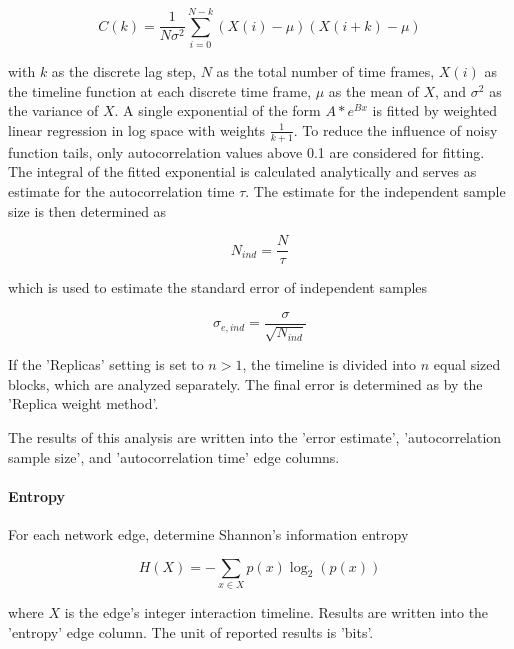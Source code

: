 \begin{equation}
  \label{eq:autocorrelation}
     C(k) = \frac{1}{N\sigma^2} \sum_{i=0}^{N-k} (X(i) - \mu) (X(i+k) - \mu)
\end{equation}

with $k$ as the discrete lag step, $N$ as the total number of time frames, $X(i)$ as the timeline function at each discrete time frame, $\mu$ as the mean of $X$, and $\sigma^2$ as the variance of $X$. A single exponential of the form $A * e^{Bx}$ is fitted by weighted linear regression in log space with weights $\frac{1}{k+1}$. To reduce the influence of noisy function tails, only autocorrelation values above 0.1 are considered for fitting. The integral of the fitted exponential is calculated analytically and serves as estimate for the autocorrelation time $\tau$. The estimate for the independent sample size is then determined as

\begin{equation}
  \label{eq:independent_sample_size}
  N_{ind} = \frac{N}{\tau}
\end{equation}

which is used to estimate the standard error of independent samples

\begin{equation}
  \label{eq:standard_error_independent}
  \sigma_{e,ind} = \frac{\sigma}{\sqrt{N_{ind}}}
\end{equation}

If the 'Replicas' setting is set to $n > 1$, the timeline is divided into $n$ equal sized blocks, which are analyzed separately. The final error is determined as by the 'Replica weight method'.

The results of this analysis are written into the 'error estimate', 'autocorrelation sample size', and 'autocorrelation time' edge columns. 

\paragraph{Entropy}
\label{sec:entropy}

For each network edge, determine Shannon's information entropy

\begin{equation}
  \label{eq:shannon_entropy}
  H(X) = -\sum_{x \in X} p(x) \log_2 (p(x))
\end{equation}

where $X$ is the edge's integer interaction timeline. Results are written into the 'entropy' edge column. The unit of reported results is 'bits'.

